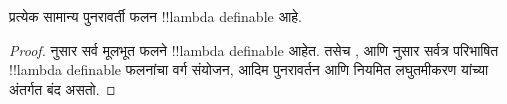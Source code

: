 \documentclass[../../../include/open-logic-section]{subfiles}
\begin{document}
\begin{prop}
  प्रत्येक सामान्य पुनरावर्ती फलन !!{lambda definable} आहे.
\end{prop}

\begin{proof}
  नुसार सर्व मूलभूत फलने
 !!{lambda definable} आहेत. तसेच ,
  आणि  नुसार
 सर्वत्र परिभाषित !!{lambda definable} फलनांचा वर्ग संयोजन,
 आदिम पुनरावर्तन आणि नियमित लघुतमीकरण यांच्या
 अंतर्गत बंद असतो.
\end{proof}
\end{document}
